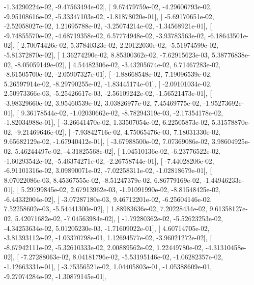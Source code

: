 \documentclass{article}
\begin{document}
         -1.34290224e-02,  -9.47563494e-02],
       [  9.67479759e-02,  -4.29606793e-02,  -9.95108616e-02,
         -5.33347103e-02,  -1.81878020e-01],
       [ -5.69170651e-02,  -2.52058027e-02,   1.21695788e-02,
         -3.25074214e-02,  -1.34568921e-01],
       [ -9.74855570e-02,  -4.68719358e-02,   6.57774948e-02,
         -3.93783563e-02,  -6.18643501e-02],
       [  2.70074426e-02,   5.37840323e-02,   2.20122030e-02,
         -5.51974599e-02,  -5.81372870e-02],
       [  1.36274290e-02,   8.85300362e-02,  -7.62915623e-03,
          5.38776838e-02,  -8.05059149e-02],
       [  4.54482306e-02,  -3.43205674e-02,   6.71467283e-02,
         -8.61505700e-02,  -2.05907327e-01],
       [ -1.88668548e-02,   7.19096539e-02,   5.26597914e-02,
         -8.29790255e-02,  -1.83445174e-01],
       [ -2.09101034e-02,   2.50973366e-03,  -5.25426617e-03,
         -2.56109242e-02,  -1.56521473e-01],
       [ -3.98329660e-02,   3.95460539e-02,   3.03826977e-02,
          7.45469775e-02,  -1.95273692e-01],
       [  9.36178544e-02,  -1.02030662e-02,  -8.78294319e-03,
         -2.17354178e-02,  -1.82034988e-01],
       [ -3.26641470e-02,   1.33507054e-02,   6.22505873e-02,
          5.31578870e-02,  -9.21469646e-02],
       [ -7.93842716e-02,   4.75065476e-03,   7.18031330e-02,
          9.65682129e-02,  -1.67940412e-01],
       [ -3.67988500e-02,   7.07369086e-02,   3.98604925e-02,
          5.46244497e-02,  -4.31825568e-02],
       [  1.04510136e-02,  -6.23776522e-02,  -1.60293542e-02,
         -5.46374271e-02,  -2.26758744e-01],
       [ -7.44028206e-02,  -6.91101316e-02,   3.09890071e-02,
         -7.02258311e-02,  -1.02818679e-01],
       [  8.07022086e-03,   8.45367555e-02,  -8.51247379e-02,
          6.86779169e-02,  -1.44946233e-01],
       [  5.29799845e-02,   2.67913962e-03,  -1.91091990e-02,
         -8.81548425e-02,  -6.44332004e-02],
       [ -3.07287180e-03,   9.46712201e-02,  -6.25604146e-02,
          7.52258602e-03,  -5.54441300e-02],
       [  1.88983636e-02,   7.20228434e-02,   9.61358127e-02,
          5.42071682e-02,  -7.04563984e-02],
       [ -1.79280362e-02,  -5.52623253e-02,  -4.34253634e-02,
          5.01205230e-03,  -1.71609022e-01],
       [  4.60714705e-02,  -3.81393112e-02,  -1.03370798e-01,
          1.12694577e-02,  -3.96021272e-02],
       [ -8.67942111e-02,  -5.32610333e-02,   2.00889562e-02,
          1.22449780e-02,  -4.31310458e-02],
       [ -7.27288063e-02,   8.04181796e-02,  -5.53195146e-02,
         -1.06282357e-02,  -1.12663331e-01],
       [ -3.75356521e-02,   1.04405803e-01,  -1.05388609e-01,
         -9.27074284e-02,  -1.30879145e-01],
\end{document}
